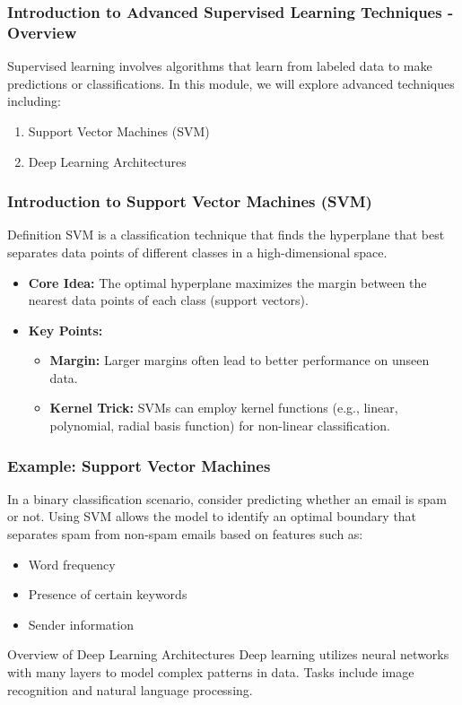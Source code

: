 \documentclass[aspectratio=169]{beamer}
\begin{document}
\frame{\titlepage}

\begin{frame}[fragile]
    \frametitle{Introduction to Advanced Supervised Learning Techniques - Overview}
    Supervised learning involves algorithms that learn from labeled data to make predictions or classifications. 
    In this module, we will explore advanced techniques including:
    \begin{enumerate}
        \item Support Vector Machines (SVM)
        \item Deep Learning Architectures
    \end{enumerate}
\end{frame}

\begin{frame}[fragile]
    \frametitle{Introduction to Support Vector Machines (SVM)}
    \begin{block}{Definition}
        SVM is a classification technique that finds the hyperplane that best separates data points of different classes in a high-dimensional space.
    \end{block}
    \begin{itemize}
        \item \textbf{Core Idea:} The optimal hyperplane maximizes the margin between the nearest data points of each class (support vectors).
        \item \textbf{Key Points:}
        \begin{itemize}
            \item \textbf{Margin:} Larger margins often lead to better performance on unseen data.
            \item \textbf{Kernel Trick:} SVMs can employ kernel functions (e.g., linear, polynomial, radial basis function) for non-linear classification.
        \end{itemize}
    \end{itemize}
\end{frame}

\begin{frame}[fragile]
    \frametitle{Example: Support Vector Machines}
    In a binary classification scenario, consider predicting whether an email is spam or not. 
    Using SVM allows the model to identify an optimal boundary that separates spam from non-spam emails based on features such as:
    \begin{itemize}
        \item Word frequency
        \item Presence of certain keywords
        \item Sender information
    \end{itemize}
    \begin{block}{Overview of Deep Learning Architectures}
        Deep learning utilizes neural networks with many layers to model complex patterns in data.
        Tasks include image recognition and natural language processing.
    \end{block}
\end{frame}
\end{document}
